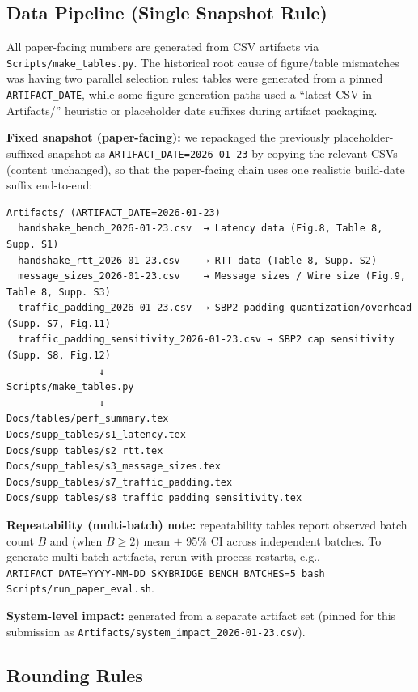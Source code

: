 \subsection*{Data Pipeline (Single Snapshot Rule)}

All paper-facing numbers are generated from CSV artifacts via \texttt{Scripts/make\_tables.py}. The historical root cause of figure/table mismatches was having two parallel selection rules: tables were generated from a pinned \texttt{ARTIFACT\_DATE}, while some figure-generation paths used a ``latest CSV in Artifacts/'' heuristic or placeholder date suffixes during artifact packaging.

\textbf{Fixed snapshot (paper-facing):} we repackaged the previously placeholder-suffixed snapshot as \texttt{ARTIFACT\_DATE=2026-01-23} by copying the relevant CSVs (content unchanged), so that the paper-facing chain uses one realistic build-date suffix end-to-end:

\begin{verbatim}
Artifacts/ (ARTIFACT_DATE=2026-01-23)
  handshake_bench_2026-01-23.csv  → Latency data (Fig.8, Table 8, Supp. S1)
  handshake_rtt_2026-01-23.csv    → RTT data (Table 8, Supp. S2)
  message_sizes_2026-01-23.csv    → Message sizes / Wire size (Fig.9, Table 8, Supp. S3)
  traffic_padding_2026-01-23.csv  → SBP2 padding quantization/overhead (Supp. S7, Fig.11)
  traffic_padding_sensitivity_2026-01-23.csv → SBP2 cap sensitivity (Supp. S8, Fig.12)
                ↓
Scripts/make_tables.py
                ↓
Docs/tables/perf_summary.tex
Docs/supp_tables/s1_latency.tex
Docs/supp_tables/s2_rtt.tex
Docs/supp_tables/s3_message_sizes.tex
Docs/supp_tables/s7_traffic_padding.tex
Docs/supp_tables/s8_traffic_padding_sensitivity.tex
\end{verbatim}

\textbf{Repeatability (multi-batch) note:} repeatability tables report observed batch count $B$ and (when $B \ge 2$) mean $\pm$ 95\% CI across independent batches. To generate multi-batch artifacts, rerun with process restarts, e.g.,
\texttt{ARTIFACT\_DATE=YYYY-MM-DD SKYBRIDGE\_BENCH\_BATCHES=5 bash Scripts/run\_paper\_eval.sh}.

\textbf{System-level impact:} generated from a separate artifact set (pinned for this submission as \texttt{Artifacts/system\_impact\_2026-01-23.csv}).

\subsection*{Rounding Rules}

